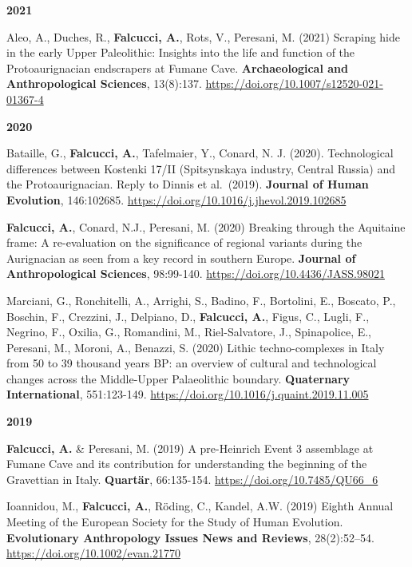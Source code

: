\documentclass[11pt,a4paper,]{awesome-cv}
\begin{document}
\setlength{\leftskip}{0cm}

\textbf{2021}

\setlength{\leftskip}{1cm}

Aleo, A., Duches, R., \textbf{Falcucci, A.}, Rots, V., Peresani, M.
(2021) Scraping hide in the early Upper Paleolithic: Insights into the
life and function of the Protoaurignacian endscrapers at Fumane Cave.
\textbf{Archaeological and Anthropological Sciences}, 13(8):137.
\url{https://doi.org/10.1007/s12520-021-01367-4}

\setlength{\leftskip}{0cm}

\textbf{2020}

\setlength{\leftskip}{1cm}

Bataille, G., \textbf{Falcucci, A.}, Tafelmaier, Y., Conard, N. J.
(2020). Technological differences between Kostenki 17/II (Spitsynskaya
industry, Central Russia) and the Protoaurignacian. Reply to Dinnis et
al.~(2019). \textbf{Journal of Human Evolution}, 146:102685.
\url{https://doi.org/10.1016/j.jhevol.2019.102685}

\textbf{Falcucci, A.}, Conard, N.J., Peresani, M. (2020) Breaking
through the Aquitaine frame: A re-evaluation on the significance of
regional variants during the Aurignacian as seen from a key record in
southern Europe. \textbf{Journal of Anthropological Sciences},
98:99-140. \url{https://doi.org/10.4436/JASS.98021}

Marciani, G., Ronchitelli, A., Arrighi, S., Badino, F., Bortolini, E.,
Boscato, P., Boschin, F., Crezzini, J., Delpiano, D., \textbf{Falcucci,
A.}, Figus, C., Lugli, F., Negrino, F., Oxilia, G., Romandini, M.,
Riel-Salvatore, J., Spinapolice, E., Peresani, M., Moroni, A., Benazzi,
S. (2020) Lithic techno-complexes in Italy from 50 to 39 thousand years
BP: an overview of cultural and technological changes across the
Middle-Upper Palaeolithic boundary. \textbf{Quaternary International},
551:123-149. \url{https://doi.org/10.1016/j.quaint.2019.11.005}

\setlength{\leftskip}{0cm}

\textbf{2019}

\setlength{\leftskip}{1cm}

\textbf{Falcucci, A.} \& Peresani, M. (2019) A pre-Heinrich Event 3
assemblage at Fumane Cave and its contribution for understanding the
beginning of the Gravettian in Italy. \textbf{Quartär}, 66:135-154.
\url{https://doi.org/10.7485/QU66_6}

Ioannidou, M., \textbf{Falcucci, A.}, Röding, C., Kandel, A.W. (2019)
Eighth Annual Meeting of the European Society for the Study of Human
Evolution. \textbf{Evolutionary Anthropology Issues News and Reviews},
28(2):52--54. \url{https://doi.org/10.1002/evan.21770}
\end{document}
